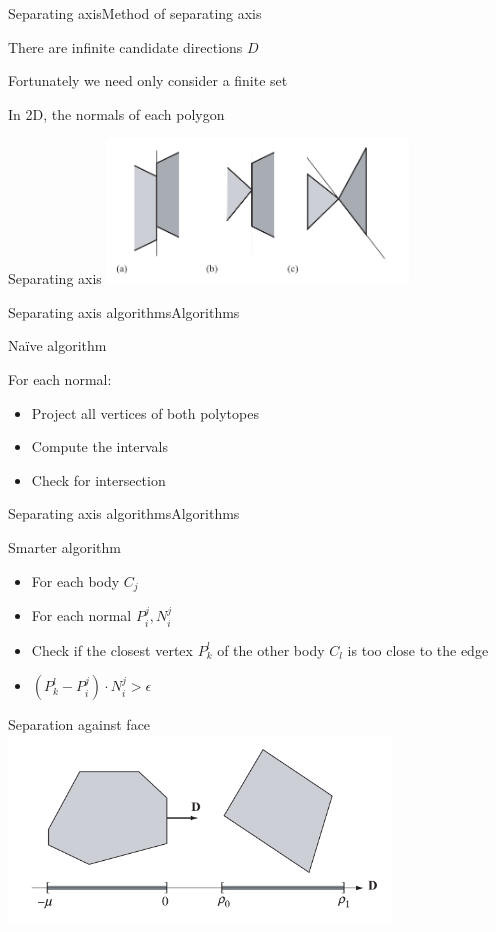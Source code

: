 \documentclass{beamer}
\begin{document}
\begin{slide}{Separating axis}{Method of separating axis}{
\item There are infinite candidate directions $D$
\item Fortunately we need only consider a finite set
\item In 2D, the normals of each polygon
}\end{slide}

\begin{frame}{Separating axis}
\center
\includegraphics[width=8cm]{Pics/SeparatingAxesIn2D.png}
\end{frame}

\begin{slide}{Separating axis algorithms}{Algorithms}{
\item Naïve algorithm
\item For each normal:
\begin{itemize}
\item Project all vertices of both polytopes
\item Compute the intervals
\item Check for intersection
\end{itemize}
}\end{slide}

\begin{slide}{Separating axis algorithms}{Algorithms}{
\item Smarter algorithm
\begin{itemize}
\item For each body $C_j$
\item For each normal $P_i^j, N_i^j$
\item Check if the closest vertex $P_k^l$ of the other body $C_l$ is too close to the edge
\item $(P_k^l - P_i^j) \cdot N_i^j > \epsilon$
\end{itemize}
}\end{slide}

\begin{frame}{Separation against face}
\center
\includegraphics[height=5cm]{Pics/SeparationOfVertex.png}
\end{frame}
\end{document}
